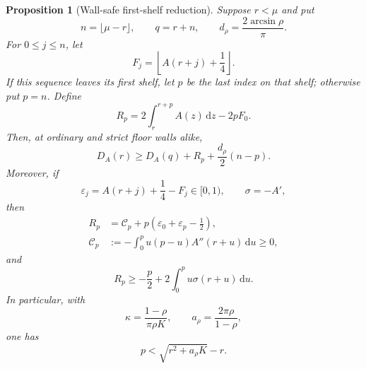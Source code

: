 \documentclass[11pt]{article}
\newtheorem{proposition}[theorem]{Proposition}
\theoremstyle{remark}
\newcommand{\dd}{\,\mathrm d}
\begin{document}
\begin{proposition}[Wall-safe first-shelf reduction]
\label{prop:first-shelf-reduction}
Suppose $r<\mu$ and put
\[
 n=\lfloor\mu-r\rfloor,
 \qquad q=r+n,
 \qquad
 d_\rho=\frac{2\arcsin\rho}{\pi}.
\]
For $0\leq j\leq n$, let
\[
 F_j=\left\lfloor A(r+j)+\frac14\right\rfloor.
\]
If this sequence leaves its first shelf, let $p$ be the last index on
that shelf; otherwise put $p=n$.  Define
\begin{equation}
 R_p=2\int_r^{r+p}A(z)\dd z-2pF_0.
 \label{eq:first-shelf-reserve}
\end{equation}
Then, at ordinary and strict floor walls alike,
\begin{equation}
 \boxed{
 D_A(r)\geq D_A(q)+R_p+\frac{d_\rho}{2}(n-p).}
 \label{eq:first-shelf-reduction}
\end{equation}
Moreover, if
\[
 \varepsilon_j=A(r+j)+\frac14-F_j\in[0,1),
 \qquad
 \sigma=-A',
\]
then
\begin{align}
 R_p
 &=\mathcal C_p+p\left(\varepsilon_0+\varepsilon_p-\frac12\right),
 \label{eq:first-shelf-exact}\\
 \mathcal C_p
 &:=-\int_0^p u(p-u)A''(r+u)\dd u\geq0,
 \label{eq:first-shelf-curvature}
\end{align}
and
\begin{equation}
 R_p\geq-\frac p2+2\int_0^p u\sigma(r+u)\dd u.
 \label{eq:first-shelf-lower}
\end{equation}
In particular, with
\[
 \kappa=\frac{1-\rho}{\pi\rho K},
 \qquad
 a_\rho=\frac{2\pi\rho}{1-\rho},
\]
one has
\begin{equation}
 p<\sqrt{r^2+a_\rho K}-r.
 \label{eq:first-shelf-sharp-cap}
\end{equation}
\end{proposition}
\end{document}
